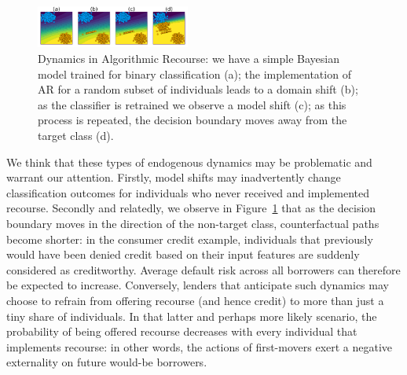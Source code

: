 \documentclass[
  conference]{IEEEtran}
\begin{document}
\begin{figure}

{\centering \includegraphics[width=0.45\textwidth,height=\textheight]{www/poc.png}

}

\caption{\label{fig-poc}Dynamics in Algorithmic Recourse: we have a
simple Bayesian model trained for binary classification (a); the
implementation of AR for a random subset of individuals leads to a
domain shift (b); as the classifier is retrained we observe a model
shift (c); as this process is repeated, the decision boundary moves away
from the target class (d).}

\end{figure}

We think that these types of endogenous dynamics may be problematic and
warrant our attention. Firstly, model shifts may inadvertently change
classification outcomes for individuals who never received and
implemented recourse. Secondly and relatedly, we observe in
Figure~\ref{fig-poc} that as the decision boundary moves in the
direction of the non-target class, counterfactual paths become shorter:
in the consumer credit example, individuals that previously would have
been denied credit based on their input features are suddenly considered
as creditworthy. Average default risk across all borrowers can therefore
be expected to increase. Conversely, lenders that anticipate such
dynamics may choose to refrain from offering recourse (and hence credit)
to more than just a tiny share of individuals. In that latter and
perhaps more likely scenario, the probability of being offered recourse
decreases with every individual that implements recourse: in other
words, the actions of first-movers exert a negative externality on
future would-be borrowers.
\end{document}
